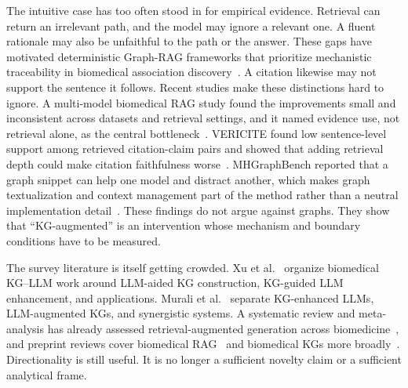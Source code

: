



The intuitive case has too often stood in for empirical evidence. Retrieval can return an irrelevant path, and the model may ignore a relevant one. A fluent rationale may also be unfaithful to the path or the answer. These gaps have motivated deterministic Graph-RAG frameworks that prioritize mechanistic traceability in biomedical association discovery~\cite{pramanik2026mechanistic}.
A citation likewise may not support the sentence it follows. Recent studies make these distinctions hard to ignore. A multi-model biomedical RAG study found the improvements small and inconsistent across datasets and retrieval settings, and it named evidence use, not retrieval alone, as the central bottleneck~\cite{nourbakhsh2026retrieval}. VERICITE found low sentence-level support among retrieved citation-claim pairs and showed that adding retrieval depth could make citation faithfulness worse~\cite{ma2026vericite}. MHGraphBench reported that a graph snippet can help one model and distract another, which makes graph textualization and context management part of the method rather than a neutral implementation detail~\cite{liu2026mhgraphbench}.  These findings do not argue against graphs. They show that ``KG-augmented'' is an intervention whose mechanism and boundary conditions have to be measured.

The survey literature is itself getting crowded. Xu et al.~\cite{xu2025biomedklm} organize biomedical KG--LLM work around LLM-aided KG construction, KG-guided LLM enhancement, and applications. Murali et al.~\cite{murali2026integrating} separate KG-enhanced LLMs, LLM-augmented KGs, and synergistic systems. A systematic review and meta-analysis has already assessed retrieval-augmented generation across biomedicine~\cite{liu2025biomedrag}, and preprint reviews cover biomedical RAG~\cite{he2025biomedrag} and biomedical KGs more broadly~\cite{lu2025biomedkg}. Directionality is still useful. It is no longer a sufficient novelty claim or a sufficient analytical frame.

